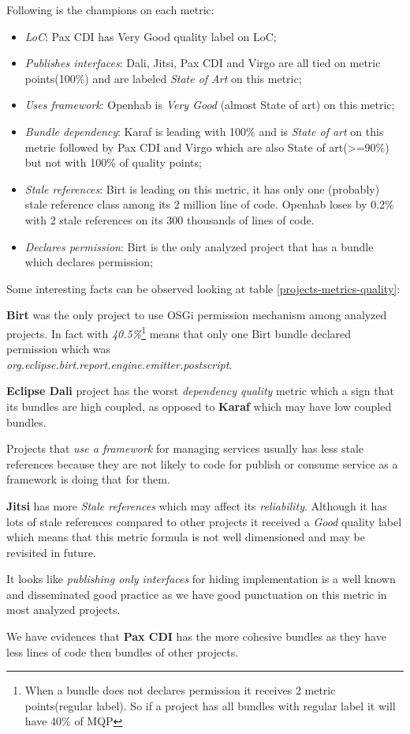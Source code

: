 Following is the champions on each metric:


\begin{itemize}
\item \emph{LoC}: Pax CDI has Very Good quality label on LoC;
\item \emph{Publishes interfaces}: Dali, Jitsi, Pax CDI and Virgo are all tied on metric points(100\%) and are labeled \emph{State of Art} on this metric;
\item \emph{Uses framework}: Openhab is \emph{Very Good} (almost State of art) on this metric;
\item \emph{Bundle dependency}: Karaf is leading with 100\% and is \emph{State of art} on this metric followed by Pax CDI and Virgo which are also State of art(>=90\%) but not with 100\% of quality points;  
\item \emph{Stale references}: Birt is leading on this metric, it has only one (probably) stale reference class among its 2 million line of code. Openhab loses by 0.2\% with 2 stale references on its 300 thousands of lines of code.  
\item \emph{Declares permission}: Birt is the only analyzed project that has a bundle which declares permission;
\end{itemize}

Some interesting facts can be observed looking at table \ref{projects-metrics-quality}:

\textbf{Birt} was the only project to use OSGi permission mechanism among analyzed projects. In fact with \emph{40.5\%}\footnote{When a bundle does not declares permission it receives 2 metric points(regular label). So if a project has all bundles with regular label it will have 40\% of MQP} means that only one Birt bundle declared permission which was \\\emph{org.eclipse.birt.report.engine.emitter.postscript}.

\textbf{Eclipse Dali} project has the worst \emph{dependency quality} metric which a sign that its bundles are high coupled, as opposed to \textbf{Karaf} which may have low coupled bundles.

Projects that \emph{use a framework} for managing services usually has less stale references because they are not likely to code for publish or consume service as a framework is doing that for them.

\textbf{Jitsi} has more \emph{Stale references} which may affect its \emph{reliability}. Although it has lots of stale references compared to other projects it received a \emph{Good} quality label which means that this metric formula is not well dimensioned and may be revisited in future.    

It looks like \emph{publishing only interfaces} for hiding implementation is a well known and disseminated good practice as we have good punctuation on this metric in most analyzed projects.  

We have evidences that \textbf{Pax CDI} has the more cohesive bundles as they have less lines of code then bundles of other projects.
 

